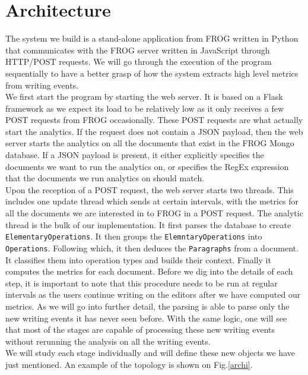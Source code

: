 \documentclass[a4, twocolumn, 12pt]{article}
\begin{document}
\section{Architecture}
The system we build is a stand-alone application from FROG written in Python that communicates with the FROG server written in JavaScript through HTTP/POST requests. We will go through the execution of the program sequentially to have a better grasp of how the system extracts high level metrics from writing events.\\
We first start the program by starting the web server. It is based on a Flask framework as we expect its load to be relatively low as it only receives a few POST requests from FROG occasionally. These POST requests are what actually start the analytics. If the request does not contain a JSON payload, then the web server starts the analytics on all the documents that exist in the FROG Mongo database. If a JSON payload is present, it either explicitly specifies the documents we want to run the analytics on, or specifies the RegEx expression that the documents we run analytics on should match.\\
Upon the reception of a POST request, the web server starts two threads. This includes one update thread which sends at certain intervals, with the metrics for all the documents we are interested in to FROG in a POST request. The analytic thread is the bulk of our implementation. It first parses the database to create \texttt{ElementaryOperations}. It then groups the \texttt{ElemntaryOperations} into \texttt{Operations}. Following which, it then deduces the \texttt{Paragraphs} from a document. It classifies them into operation types and builds their context. Finally it computes the metrics for each document. Before we dig into the details of each step, it is important to note that this procedure needs to be run at regular intervals as the users continue writing on the editors after we have computed our metrics. As we will go into further detail, the parsing is able to parse only the new writing events it has never seen before. With the same logic, one will see that most of the stages are capable of processing these new writing events without rerunning the analysis on all the writing events.\\
We will study each stage individually and will define these new objects we have just mentioned. An example of the topology is shown on Fig.\ref{archi}.
\end{document}
